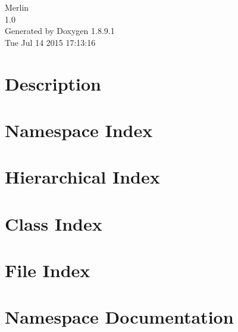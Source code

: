 \documentclass[twoside]{book}
\newcommand{\+}{\discretionary{\mbox{\scriptsize$\hookleftarrow$}}{}{}}
\newcommand{\clearemptydoublepage}{%
  \newpage{\pagestyle{empty}\cleardoublepage}%
}
\begin{document}
\hypersetup{pageanchor=false,
             bookmarks=true,
             bookmarksnumbered=true,
             pdfencoding=unicode
            }
\begin{titlepage}
\vspace*{7cm}
\begin{center}%
{\Large Merlin \\[1ex]\large 1.\+0 }\\
\vspace*{1cm}
{\large Generated by Doxygen 1.8.9.1}\\
\vspace*{0.5cm}
{\small Tue Jul 14 2015 17:13:16}\\
\end{center}
\end{titlepage}
\clearemptydoublepage
\tableofcontents
\clearemptydoublepage
{}
\hypersetup{pageanchor=true}

\chapter{Description}
\label{md_README}
\hypertarget{md_README}{}

\chapter{Namespace Index}

\chapter{Hierarchical Index}

\chapter{Class Index}

\chapter{File Index}

\chapter{Namespace Documentation}

\end{document}
